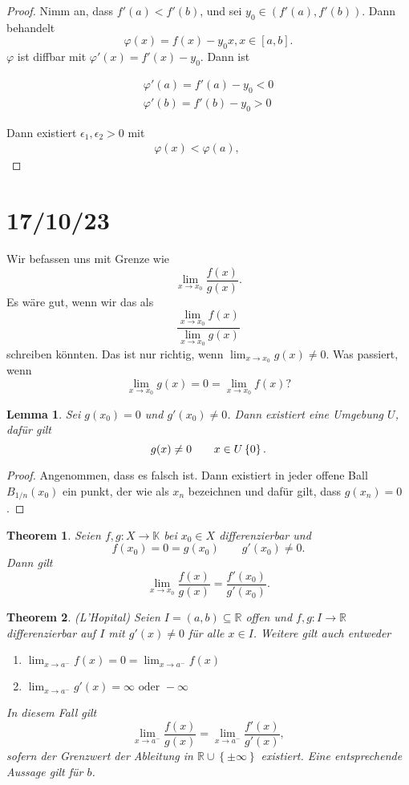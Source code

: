 \documentclass[prb,12pt]{revtex4-2}
\newtheorem{Theorem}{Theorem}
\newtheorem{Proposition}{Theorem}
\newtheorem{Lemma}[Theorem]{Lemma}
\theoremstyle{definition}
\theoremstyle{definition}
\newcommand{\R}{\mathbb{R}}
\begin{document}
\begin{proof}
	Nimm an, dass $f'(a)<f'(b)$, und sei $y_0\in (f'(a), f'(b))$. Dann behandelt
	\[
		\varphi(x)=f(x)-y_0x, x\in [a,b]
	.\] 
	$\varphi$ ist diffbar mit $\varphi'(x)=f'(x)-y_0$. Dann ist

	\begin{gather*}
		\varphi'(a)=f'(a)-y_0<0\\
		\varphi'(b)=f'(b)-y_0>0
	\end{gather*}

	Dann existiert $\epsilon_1, \epsilon_2>0$ mit
	\begin{gather*}
		\varphi(x)<\varphi(a), \qquad 
	\end{gather*}
\end{proof}
\section{17/10/23}
Wir befassen uns mit Grenze wie
\[
\lim_{x \to x_0} \frac{f(x)}{g(x)}
.\] 
Es wäre gut, wenn wir das als
\[
\frac{\lim_{x \to x_0} f(x)}{\lim_{x \to x_0} g(x)}
\] 
schreiben könnten. Das ist nur richtig, wenn $\lim_{x \to x_0} g(x)\neq 0$. Was passiert, wenn
\[
\lim_{x \to x_0} g(x)=0=\lim_{x \to x_0} f(x)?\] 
\begin{Lemma}
	Sei $g(x_0)=0$ und $g'(x_0)\neq 0$. Dann existiert eine Umgebung $U$, daf\"{u}r gilt
	\[
	g(x)\neq 0 \qquad x\in U \\ \left\{ 0 \right\} 
	.\] 
\end{Lemma}
\begin{proof}
	Angenommen, dass es falsch ist. Dann existiert in jeder offene Ball $B_{1 / n}(x_0)$ ein punkt, der wie als $x_n$ bezeichnen und daf\"{u}r gilt, dass $g(x_n)=0$. 
\end{proof}
\begin{Proposition}
	Seien $f,g: X\to \mathbb{K}$ bei $x_0\in X$ differenzierbar und
	\[
	f(x_0)=0=g(x_0) \qquad g'(x_0)\neq 0.\]
	Dann gilt
	\[
	\lim_{x \to x_0} \frac{f(x)}{g(x)}=\frac{f'(x_0)}{g'(x_0)}
	.\] 
\end{Proposition}

\begin{Theorem}
	(L'Hopital) Seien $I=(a,b)\subseteq \R$ offen und $f,g:I\to \R$ differenzierbar auf $I$ mit $g'(x)\neq 0$ f\"{u}r alle $x\in I$. Weitere gilt auch entweder
	\begin{enumerate}[label=(\roman*)]
		\item $\lim_{x \to a^{-}} f(x)=0= \lim_{x \to a^{-}} f(x)$
		\item $\lim_{x \to a^{-}} g'(x)=\infty\text{ oder }-\infty$
	\end{enumerate}
	In diesem Fall gilt
	\[
		\lim_{x \to a^{-}} \frac{f(x)}{g(x)}=\lim_{x \to a^{-}} \frac{f'(x)}{g'(x)}
	,\]
	sofern der Grenzwert der Ableitung in $\R\cup \left\{ \pm\infty \right\} $ existiert. Eine entsprechende Aussage gilt f\"{u}r $b$.
\end{Theorem}
\end{document}
